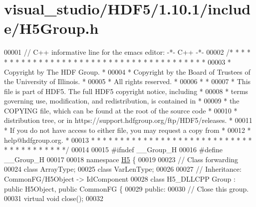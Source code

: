 \hypertarget{visual__studio_2_h_d_f5_21_810_81_2include_2_h5_group_8h_source}{}\section{visual\+\_\+studio/\+H\+D\+F5/1.10.1/include/\+H5\+Group.h}
\label{visual__studio_2_h_d_f5_21_810_81_2include_2_h5_group_8h_source}

\begin{DoxyCode}
00001 \textcolor{comment}{// C++ informative line for the emacs editor: -*- C++ -*-}
00002 \textcolor{comment}{/* * * * * * * * * * * * * * * * * * * * * * * * * * * * * * * * * * * * * * *}
00003 \textcolor{comment}{ * Copyright by The HDF Group.                                               *}
00004 \textcolor{comment}{ * Copyright by the Board of Trustees of the University of Illinois.         *}
00005 \textcolor{comment}{ * All rights reserved.                                                      *}
00006 \textcolor{comment}{ *                                                                           *}
00007 \textcolor{comment}{ * This file is part of HDF5.  The full HDF5 copyright notice, including     *}
00008 \textcolor{comment}{ * terms governing use, modification, and redistribution, is contained in    *}
00009 \textcolor{comment}{ * the COPYING file, which can be found at the root of the source code       *}
00010 \textcolor{comment}{ * distribution tree, or in https://support.hdfgroup.org/ftp/HDF5/releases.  *}
00011 \textcolor{comment}{ * If you do not have access to either file, you may request a copy from     *}
00012 \textcolor{comment}{ * help@hdfgroup.org.                                                        *}
00013 \textcolor{comment}{ * * * * * * * * * * * * * * * * * * * * * * * * * * * * * * * * * * * * * * */}
00014 
00015 \textcolor{preprocessor}{#ifndef \_\_Group\_H}
00016 \textcolor{preprocessor}{#define \_\_Group\_H}
00017 
00018 \textcolor{keyword}{namespace }\hyperlink{namespace_h5}{H5} \{
00019 
00023 \textcolor{comment}{// Class forwarding}
00024 \textcolor{keyword}{class }ArrayType;
00025 \textcolor{keyword}{class }VarLenType;
00026 
00027 \textcolor{comment}{//  Inheritance: CommonFG/H5Object -> IdComponent}
00028 \textcolor{keyword}{class }H5\_DLLCPP Group : \textcolor{keyword}{public} H5Object, \textcolor{keyword}{public} CommonFG \{
00029    \textcolor{keyword}{public}:
00030         \textcolor{comment}{// Close this group.}
00031         \textcolor{keyword}{virtual} \textcolor{keywordtype}{void} close();
00032 

\end{DoxyCode}
